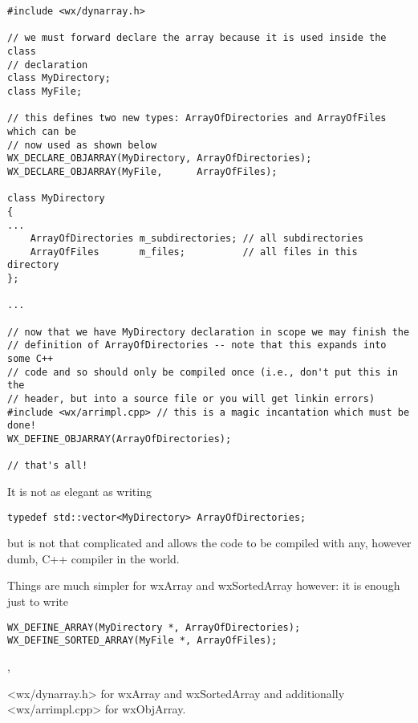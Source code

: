 \begin{verbatim}
#include <wx/dynarray.h>

// we must forward declare the array because it is used inside the class
// declaration
class MyDirectory;
class MyFile;

// this defines two new types: ArrayOfDirectories and ArrayOfFiles which can be
// now used as shown below
WX_DECLARE_OBJARRAY(MyDirectory, ArrayOfDirectories);
WX_DECLARE_OBJARRAY(MyFile,      ArrayOfFiles);

class MyDirectory
{
...
    ArrayOfDirectories m_subdirectories; // all subdirectories
    ArrayOfFiles       m_files;          // all files in this directory
};

...

// now that we have MyDirectory declaration in scope we may finish the
// definition of ArrayOfDirectories -- note that this expands into some C++
// code and so should only be compiled once (i.e., don't put this in the
// header, but into a source file or you will get linkin errors)
#include <wx/arrimpl.cpp> // this is a magic incantation which must be done!
WX_DEFINE_OBJARRAY(ArrayOfDirectories);

// that's all!
\end{verbatim}

It is not as elegant as writing

\begin{verbatim} 
typedef std::vector<MyDirectory> ArrayOfDirectories;
\end{verbatim}

but is not that complicated and allows the code to be compiled with any, however
dumb, C++ compiler in the world.

Things are much simpler for wxArray and wxSortedArray however: it is enough
just to write

\begin{verbatim} 
WX_DEFINE_ARRAY(MyDirectory *, ArrayOfDirectories);
WX_DEFINE_SORTED_ARRAY(MyFile *, ArrayOfFiles);
\end{verbatim}


, 


<wx/dynarray.h> for wxArray and wxSortedArray and additionally <wx/arrimpl.cpp>
for wxObjArray.


